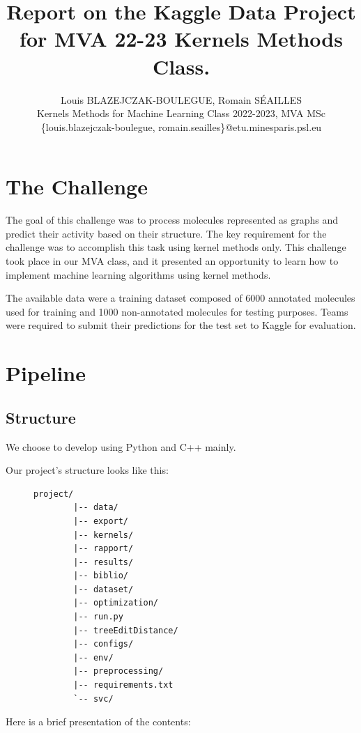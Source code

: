 \documentclass{IEEEtran}
\title{
    \huge{
        Report on the Kaggle Data Project
        for
        MVA 22-23 Kernels Methods Class.
        }
}
\author{Louis BLAZEJCZAK-BOULEGUE, Romain SÉAILLES\\
Kernels Methods for Machine Learning Class 2022-2023, MVA MSc\\
    \{louis.blazejczak-boulegue, romain.seailles\}@etu.minesparis.psl.eu
}
\begin{document}
\maketitle

\section{The Challenge}

The goal of this challenge was to process molecules represented as graphs and predict their activity based on their structure. The key requirement for the challenge was to accomplish this task using kernel methods only. This challenge took place in our MVA class, and it presented an opportunity to learn how to implement machine learning algorithms using kernel methods.

The available data were a training dataset composed of 6000 annotated molecules used for training and 1000 non-annotated molecules for testing purposes. Teams were required to submit their predictions for the test set to Kaggle for evaluation.

\section{Pipeline}

\subsection{Structure}
We choose to develop using Python and C++ mainly.

Our project's structure looks like this:

\begin{figure}[h]
    \begin{lstlisting}[frame=none,basicstyle=\ttfamily]
        project/
        |-- data/
        |-- export/
        |-- kernels/
        |-- rapport/
        |-- results/
        |-- biblio/
        |-- dataset/
        |-- optimization/
        |-- run.py
        |-- treeEditDistance/
        |-- configs/
        |-- env/
        |-- preprocessing/
        |-- requirements.txt
        `-- svc/
    \end{lstlisting}
    \label{fig:project-structure}
\end{figure}


Here is a brief presentation of the contents:
\end{document}
